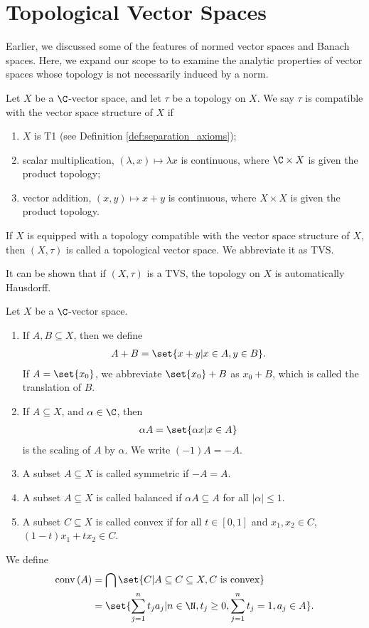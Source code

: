 \section{Topological Vector Spaces}%
Earlier, we discussed some of the features of normed vector spaces and Banach spaces. Here, we expand our scope to to examine the analytic properties of vector spaces whose topology is not necessarily induced by a norm. 
\begin{definition}\label{def:tvs}
  Let $X$ be a $\C$-vector space, and let $\tau$ be a topology on $X$. We say $\tau$ is compatible with the vector space structure of $X$ if
  \begin{enumerate}[(1)]
    \item $X$ is T1 (see Definition \ref{def:separation_axioms});
    \item scalar multiplication, $(\lambda,x)\mapsto \lambda x$ is continuous, where $\C\times X$ is given the product topology;
    \item vector addition, $(x,y) \mapsto x + y$ is continuous, where $X\times X$ is given the product topology.
  \end{enumerate}
  If $X$ is equipped with a topology compatible with the vector space structure of $X$, then $(X,\tau)$ is called a topological vector space. We abbreviate it as TVS.
\end{definition}
\begin{remark}
  It can be shown that if $(X,\tau)$ is a TVS, the topology on $X$ is automatically Hausdorff.
\end{remark}
\begin{definition}
  Let $X$ be a $\C$-vector space.
  \begin{enumerate}[(1)]
    \item If $A,B\subseteq X$, then we define
      \begin{align*}
        A + B &= \set{x + y | x\in A,y\in B}.
      \end{align*}
      If $A = \set{x_0}$, we abbreviate $\set{x_0} + B$ as $x_0 + B$, which is called the translation of $B$.
    \item If $A\subseteq X$, and $\alpha\in \C$, then
      \begin{align*}
        \alpha A &= \set{\alpha x | x\in A}
      \end{align*}
      is the scaling of $A$ by $\alpha$. We write $(-1)A = -A$.
    \item A subset $A\subseteq X$ is called symmetric if $-A = A$.
    \item A subset $A\subseteq X$ is called balanced if $\alpha A\subseteq A$ for all $\left\vert \alpha \right\vert\leq 1$.
    \item A subset $C\subseteq X$ is called convex if for all $t\in [0,1]$ and $x_1,x_2\in C$, $\left(1-t\right)x_1 + tx_2 \in C$.
  \end{enumerate}
  We define
  \begin{align*}
    \operatorname{conv}\left(A\right) &= \bigcap\set{C | A\subseteq C\subseteq X,C\text{ is convex}}\\
                                      &= \set{\sum_{j=1}^{n}t_ja_j | n\in\N,t_j\geq 0,\sum_{j=1}^{n}t_j = 1,a_j\in A}.
  \end{align*}
\end{definition}
